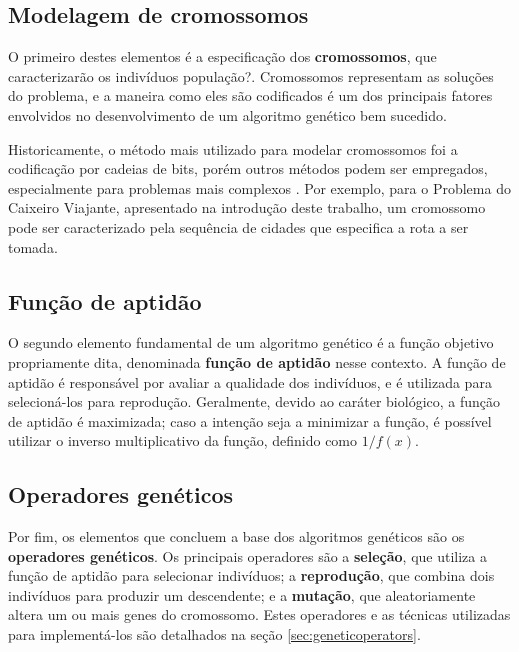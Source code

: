 \documentclass[12pt]{article}
\begin{document}
\subsection{Modelagem de cromossomos} \label{sec:chromosomes}

O primeiro destes elementos é a especificação dos \textbf{cromossomos}, que caracterizarão os indivíduos população?. Cromossomos representam as soluções do problema, e a maneira como eles são codificados é um dos principais fatores envolvidos no desenvolvimento de um algoritmo genético bem sucedido.

Historicamente, o método mais utilizado para modelar cromossomos foi a codificação por cadeias de bits, porém outros métodos podem ser empregados, especialmente para problemas mais complexos \cite{Mitchell1998}. Por exemplo, para o Problema do Caixeiro Viajante, apresentado na introdução deste trabalho, um cromossomo pode ser caracterizado pela sequência de cidades que especifica a rota a ser tomada.

\subsection{Função de aptidão} \label{sec:fitnessfunction}

O segundo elemento fundamental de um algoritmo genético é a função objetivo propriamente dita, denominada \textbf{função de aptidão} nesse contexto. A função de aptidão é responsável por avaliar a qualidade dos indivíduos, e é utilizada para selecioná-los para reprodução. Geralmente, devido ao caráter biológico, a função de aptidão é maximizada; caso a intenção seja a minimizar a função, é possível utilizar o inverso multiplicativo da função, definido como $1 / f(x)$.

\subsection{Operadores genéticos} \label{sec:operatorsbrief}

Por fim, os elementos que concluem a base dos algoritmos genéticos são os \textbf{operadores genéticos}. Os principais operadores são a \textbf{seleção}, que utiliza a função de aptidão para selecionar indivíduos; a \textbf{reprodução}, que combina dois indivíduos para produzir um descendente; e a \textbf{mutação}, que aleatoriamente altera um ou mais genes do cromossomo. Estes operadores e as técnicas utilizadas para implementá-los são detalhados na seção \ref{sec:geneticoperators}.
\end{document}
